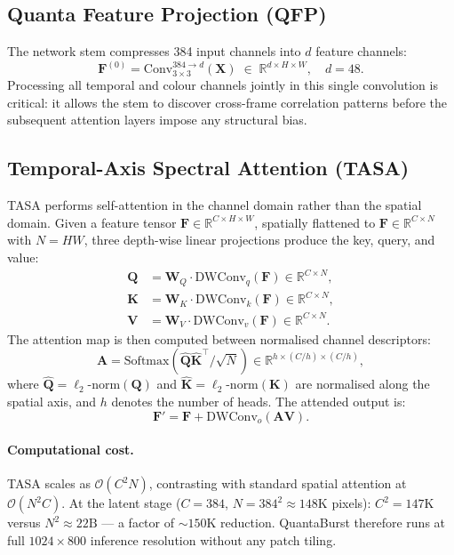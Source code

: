 \documentclass[10pt,twocolumn,letterpaper]{article}
\newcommand{\Real}{\mathbb{R}}
\newcommand{\vX}{\mathbf{X}}
\newcommand{\bF}{\mathbf{F}}
\newcommand{\bQ}{\mathbf{Q}}
\newcommand{\bK}{\mathbf{K}}
\newcommand{\bV}{\mathbf{V}}
\newcommand{\bA}{\mathbf{A}}
\begin{document}
\subsection{Quanta Feature Projection (QFP)}

The network stem compresses 384 input channels into $d$ feature
channels:
\begin{equation}
  \bF^{(0)} = \mathrm{Conv}_{3\times3}^{384\to d}(\vX)
    \;\in\; \Real^{d\times H\times W}, \quad d{=}48.
  \label{eq:qfp}
\end{equation}
Processing all temporal and colour channels jointly in this single
convolution is critical: it allows the stem to discover cross-frame
correlation patterns before the subsequent attention layers impose
any structural bias.

\subsection{Temporal-Axis Spectral Attention (TASA)}

TASA performs self-attention in the channel domain rather than the
spatial domain.  Given a feature tensor
$\bF\in\Real^{C\times H\times W}$, spatially flattened to
$\bF\in\Real^{C\times N}$ with $N{=}HW$, three
depth-wise linear projections produce the key, query, and value:
\begin{align}
  \bQ &= \mathbf{W}_Q\cdot\mathrm{DWConv}_q(\bF)\in\Real^{C\times N},
  \label{eq:tasa_q}\\
  \bK &= \mathbf{W}_K\cdot\mathrm{DWConv}_k(\bF)\in\Real^{C\times N},
  \label{eq:tasa_k}\\
  \bV &= \mathbf{W}_V\cdot\mathrm{DWConv}_v(\bF)\in\Real^{C\times N}.
  \label{eq:tasa_v}
\end{align}
The attention map is then computed between normalised
channel descriptors:
\begin{equation}
  \bA = \mathrm{Softmax}\!\left(
    \hat{\bQ}\hat{\bK}^\top / \sqrt{N}
  \right) \in \Real^{h\times(C/h)\times(C/h)},
  \label{eq:tasa}
\end{equation}
where $\hat{\bQ} = \ell_2\text{-norm}(\bQ)$ and
$\hat{\bK} = \ell_2\text{-norm}(\bK)$ are normalised along
the spatial axis, and $h$ denotes the number of heads.
The attended output is:
\begin{equation}
  \bF' = \bF + \mathrm{DWConv}_o(\bA\bV).
  \label{eq:tasa_out}
\end{equation}

\paragraph{Computational cost.}
TASA scales as $\mathcal{O}(C^2N)$, contrasting with standard
spatial attention at $\mathcal{O}(N^2C)$.
At the latent stage ($C{=}384$, $N{=}384^2{\approx}148\text{K}$
pixels): $C^2{=}147\text{K}$ versus $N^2{\approx}22\text{B}$
--- a factor of ${\sim}150\text{K}$ reduction.
QuantaBurst therefore runs at full $1024{\times}800$ inference
resolution without any patch tiling.
\end{document}
